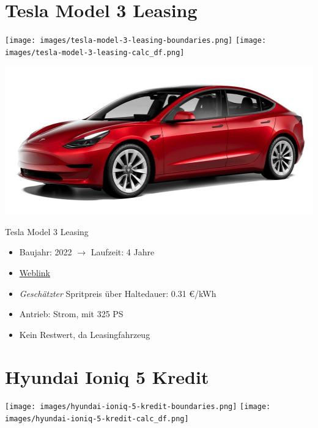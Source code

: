 \documentclass[landscape, DIV=99, 14pt]{scrartcl}
\begin{document}
\pagebreak


\twocolumn

\section*{Tesla Model 3 Leasing}
\begin{center}
\texttt{[image: images/tesla-model-3-leasing-boundaries.png]}
\null
\vspace{0.5cm}
\texttt{[image: images/tesla-model-3-leasing-calc\_df.png]}
\end{center}

\pagebreak
\null
\vspace{2cm}
\begin{center}
\includegraphics[width=0.9\columnwidth]{cars/tesla-model-3-leasing.jpg}

Tesla Model 3 Leasing
\end{center}

\begin{itemize}
    \item Baujahr: 2022 $\rightarrow$ Laufzeit: 4 Jahre
    \item \href{https://www.tesla.com/de_de/model3/design\#overview}{Weblink}
    \item \emph{Gesch\"atzter} Spritpreis \"uber Haltedauer: 0.31 \euro{}/kWh
    \item Antrieb: Strom, mit 325 PS
    \item Kein Restwert, da Leasingfahrzeug
\end{itemize}

\pagebreak


\twocolumn

\section*{Hyundai Ioniq 5 Kredit}
\begin{center}
\texttt{[image: images/hyundai-ioniq-5-kredit-boundaries.png]}
\null
\vspace{0.5cm}
\texttt{[image: images/hyundai-ioniq-5-kredit-calc\_df.png]}
\end{center}
\end{document}
